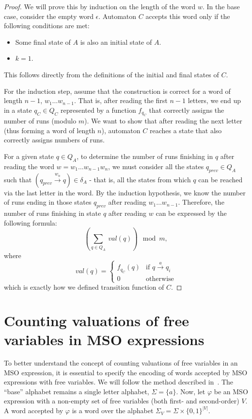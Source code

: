 \documentclass[en]{pracamgr}
\theoremstyle{definition}
\begin{document}
\begin{proof}
    We will prove this by induction on the length of the word $w$. In the base case, consider the empty word $\epsilon$. Automaton $C$ accepts this word only if the following conditions are met:
    \begin{itemize}
        \item Some final state of $A$ is also an initial state of $A$.
        \item $k = 1$.
    \end{itemize}
    This follows directly from the definitions of the initial and final states of $C$.
    
    For the induction step, assume that the construction is correct for a word of length $n-1$, $w_1 \ldots w_{n-1}$. That is, after reading the first $n-1$ letters, we end up in a state $q_C \in Q_C$ represented by a function $f_{q_C}$ that correctly assigns the number of runs (modulo $m$). We want to show that after reading the next letter (thus forming a word of length $n$), automaton $C$ reaches a state that also correctly assigns numbers of runs. 
    
    For a given state $q \in Q_A$, to determine the number of runs finishing in $q$ after reading the word $w = w_1\ldots w_{n-1}w_n$, we must consider all the states $q_{prev} \in Q_A$ such that $(q_{prev} \xrightarrow{w_n} q) \in \delta_A$ - that is, all the states from which $q$ can be reached via the last letter in the word. By the induction hypothesis, we know the number of runs ending in those states $q_{prev}$ after reading $w_1 \ldots w_{n-1}$. Therefore, the number of runs finishing in state $q$ after reading $w$ can be expressed by the following formula:
    $$(\sum_{q \in Q_A} \ val(q)) \mod m,$$
    where
    \begin{equation*}
        val(q) =
            \begin{cases}
            f_{q_C}(q) & \text{if $q \xrightarrow{a} q_i$} \\
            0 & \text{otherwise}
            \end{cases}       
    \end{equation*}
    which is exactly how we defined transition function of $C$.
\end{proof}

\section{Counting valuations of free variables in MSO expressions}

To better understand the concept of counting valuations of free variables in an MSO expression, it is essential to specify the encoding of words accepted by MSO expressions with free variables. We will follow the method described in~\cite{KreutzerR13}. The ``base'' alphabet remains a single letter alphabet, $\Sigma = \{a\}$. Now, let $\varphi$ be an MSO expression with a non-empty set of free variables (both first- and second-order) $V$. A word accepted by $\varphi$ is a word over the alphabet $\Sigma_V = \Sigma \times \{0, 1\}^{|V|}$. 
\end{document}
